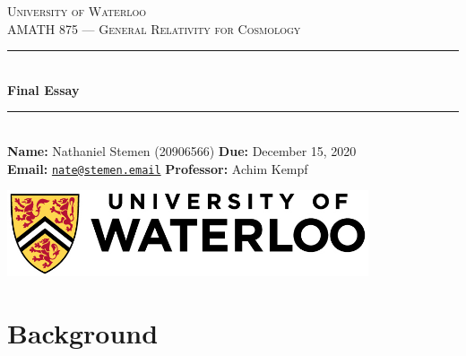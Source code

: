 \documentclass[11pt,english]{article}
\theoremstyle{definition}
\begin{document}
\begin{titlepage}
	\newcommand{\HRule}{\rule{\linewidth}{0.5mm}}

	\begin{center}

		\textsc{\LARGE University of Waterloo}\\[1.5cm]

		\textsc{\large AMATH 875 --- General Relativity for Cosmology}\\[0.75cm]

		\HRule{}\\[0.4cm]

		{\huge\bfseries Final Essay}\\[0.15cm]

		\HRule{}\\[1cm]

		{\large
		\textbf{Name:} Nathaniel Stemen (20906566)\hspace{\fill} \textbf{Due:} December 15, 2020 \\
		\textbf{Email:} \href{mailto:nate@stemen.email}{\texttt{nate@stemen.email}} \hspace{\fill} \textbf{Professor:} Achim Kempf
		}

		\vfill
		\includegraphics[width=0.8\textwidth]{uwlogo.jpg}\\[1cm]
	\end{center}
\end{titlepage}

\begingroup
{}
\hypersetup{linkcolor=darkblue}
\tableofcontents
\endgroup


\vspace{0.5cm}

\section{Background}

\cite{inverse-problems}

\clearpage


\end{document}
